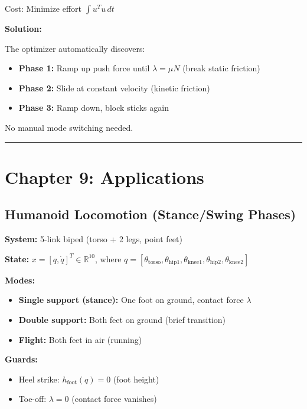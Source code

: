 \documentclass[
  letterpaper,
  DIV=11,
  numbers=noendperiod]{scrartcl}
\providecommand{\tightlist}{%
  \setlength{\itemsep}{0pt}\setlength{\parskip}{0pt}}\usepackage{longtable,booktabs,array}
\begin{document}
Cost: Minimize effort \(\int u^T u \, dt\)

\textbf{Solution:}

The optimizer automatically discovers:

\begin{itemize}
\tightlist
\item
  \textbf{Phase 1:} Ramp up push force until \(\lambda = \mu N\) (break
  static friction)
\item
  \textbf{Phase 2:} Slide at constant velocity (kinetic friction)
\item
  \textbf{Phase 3:} Ramp down, block sticks again
\end{itemize}

No manual mode switching needed.

\begin{center}\rule{0.5\linewidth}{0.5pt}\end{center}

\section{Chapter 9: Applications}\label{sec-applications}

\subsection{Humanoid Locomotion (Stance/Swing
Phases)}\label{humanoid-locomotion-stanceswing-phases}

\textbf{System:} 5-link biped (torso + 2 legs, point feet)

\textbf{State:} \(x = [q, \dot{q}]^T \in \mathbb{R}^{10}\), where
\(q = [\theta_{\text{torso}}, \theta_{\text{hip1}}, \theta_{\text{knee1}}, \theta_{\text{hip2}}, \theta_{\text{knee2}}]\)

\textbf{Modes:}

\begin{itemize}
\tightlist
\item
  \textbf{Single support (stance):} One foot on ground, contact force
  \(\lambda\)
\item
  \textbf{Double support:} Both feet on ground (brief transition)
\item
  \textbf{Flight:} Both feet in air (running)
\end{itemize}

\textbf{Guards:}

\begin{itemize}
\tightlist
\item
  Heel strike: \(h_{\text{foot}}(q) = 0\) (foot height)
\item
  Toe-off: \(\lambda = 0\) (contact force vanishes)
\end{itemize}
\end{document}
